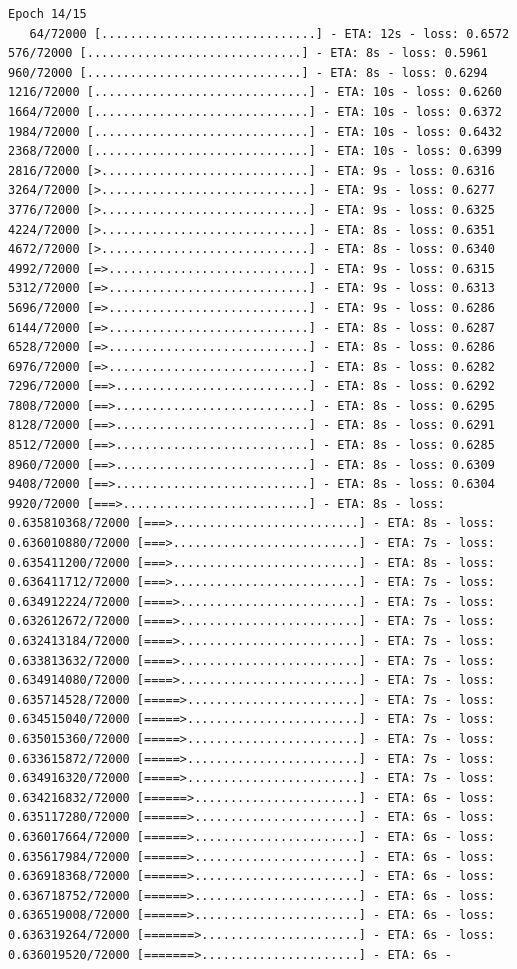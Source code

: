 \documentclass[12pt,fleqn]{article}\usepackage{../../common}
\begin{document}
\begin{verbatim}
Epoch 14/15
   64/72000 [..............................] - ETA: 12s - loss: 0.6572  576/72000 [..............................] - ETA: 8s - loss: 0.5961   960/72000 [..............................] - ETA: 8s - loss: 0.6294 1216/72000 [..............................] - ETA: 10s - loss: 0.6260 1664/72000 [..............................] - ETA: 10s - loss: 0.6372 1984/72000 [..............................] - ETA: 10s - loss: 0.6432 2368/72000 [..............................] - ETA: 10s - loss: 0.6399 2816/72000 [>.............................] - ETA: 9s - loss: 0.6316  3264/72000 [>.............................] - ETA: 9s - loss: 0.6277 3776/72000 [>.............................] - ETA: 9s - loss: 0.6325 4224/72000 [>.............................] - ETA: 8s - loss: 0.6351 4672/72000 [>.............................] - ETA: 8s - loss: 0.6340 4992/72000 [=>............................] - ETA: 9s - loss: 0.6315 5312/72000 [=>............................] - ETA: 9s - loss: 0.6313 5696/72000 [=>............................] - ETA: 9s - loss: 0.6286 6144/72000 [=>............................] - ETA: 8s - loss: 0.6287 6528/72000 [=>............................] - ETA: 8s - loss: 0.6286 6976/72000 [=>............................] - ETA: 8s - loss: 0.6282 7296/72000 [==>...........................] - ETA: 8s - loss: 0.6292 7808/72000 [==>...........................] - ETA: 8s - loss: 0.6295 8128/72000 [==>...........................] - ETA: 8s - loss: 0.6291 8512/72000 [==>...........................] - ETA: 8s - loss: 0.6285 8960/72000 [==>...........................] - ETA: 8s - loss: 0.6309 9408/72000 [==>...........................] - ETA: 8s - loss: 0.6304 9920/72000 [===>..........................] - ETA: 8s - loss: 0.635810368/72000 [===>..........................] - ETA: 8s - loss: 0.636010880/72000 [===>..........................] - ETA: 7s - loss: 0.635411200/72000 [===>..........................] - ETA: 8s - loss: 0.636411712/72000 [===>..........................] - ETA: 7s - loss: 0.634912224/72000 [====>.........................] - ETA: 7s - loss: 0.632612672/72000 [====>.........................] - ETA: 7s - loss: 0.632413184/72000 [====>.........................] - ETA: 7s - loss: 0.633813632/72000 [====>.........................] - ETA: 7s - loss: 0.634914080/72000 [====>.........................] - ETA: 7s - loss: 0.635714528/72000 [=====>........................] - ETA: 7s - loss: 0.634515040/72000 [=====>........................] - ETA: 7s - loss: 0.635015360/72000 [=====>........................] - ETA: 7s - loss: 0.633615872/72000 [=====>........................] - ETA: 7s - loss: 0.634916320/72000 [=====>........................] - ETA: 7s - loss: 0.634216832/72000 [======>.......................] - ETA: 6s - loss: 0.635117280/72000 [======>.......................] - ETA: 6s - loss: 0.636017664/72000 [======>.......................] - ETA: 6s - loss: 0.635617984/72000 [======>.......................] - ETA: 6s - loss: 0.636918368/72000 [======>.......................] - ETA: 6s - loss: 0.636718752/72000 [======>.......................] - ETA: 6s - loss: 0.636519008/72000 [======>.......................] - ETA: 6s - loss: 0.636319264/72000 [=======>......................] - ETA: 6s - loss: 0.636019520/72000 [=======>......................] - ETA: 6s - 
\end{verbatim}
\end{document}
